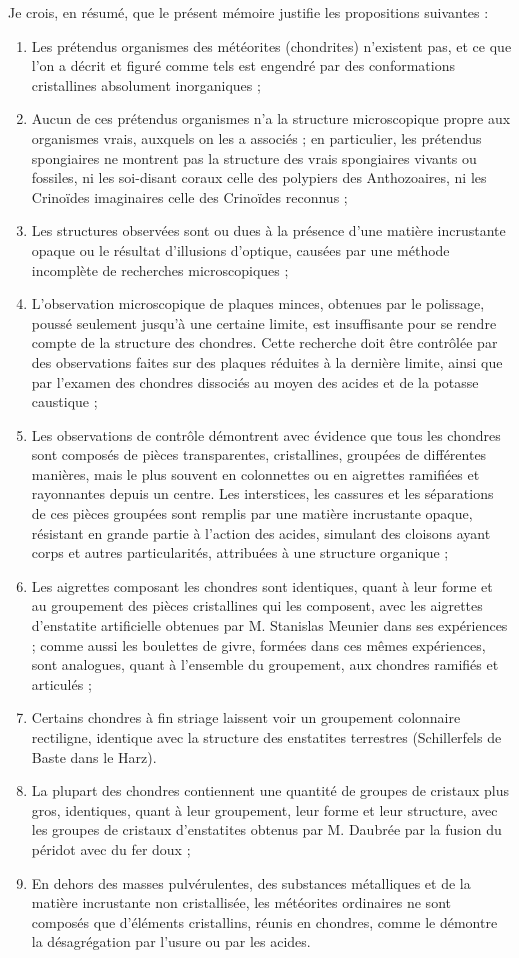 \documentclass[a4paper, 12pt, oneside, french]{book}
\begin{document}
Je crois, en résumé, que le présent mémoire justifie les propositions suivantes :
\begin{enumerate}
\item Les prétendus organismes des météorites (chondrites) n'existent pas, et ce que l'on a décrit et figuré comme tels est engendré par des conformations cristallines absolument inorganiques ;
\item Aucun de ces prétendus organismes n'a la structure microscopique propre aux organismes vrais, auxquels on les a associés ; en particulier, les prétendus spongiaires ne montrent pas la structure des vrais spongiaires vivants ou fossiles, ni les soi-disant coraux celle des polypiers des Anthozoaires, ni les Crinoïdes imaginaires celle des Crinoïdes reconnus ;
\item Les structures observées sont ou dues à la présence d'une matière incrustante opaque ou le résultat d'illusions d'optique, causées par une méthode incomplète de recherches microscopiques ;
\item L'observation microscopique de plaques minces, obtenues par le polissage, poussé seulement jusqu'à une certaine limite, est insuffisante pour se rendre compte de la structure des chondres. Cette recherche doit être contrôlée par des observations faites sur des plaques réduites à la dernière limite, ainsi que par l'examen des chondres dissociés au moyen des acides et de la potasse caustique ;
\item Les observations de contrôle démontrent avec évidence que tous les chondres sont composés de pièces transparentes, cristallines, groupées de différentes manières, mais le plus souvent en colonnettes ou en aigrettes ramifiées et rayonnantes depuis un centre. Les interstices, les cassures et les séparations de ces pièces groupées sont remplis par une matière incrustante opaque, résistant en grande partie à l'action des acides, simulant des cloisons \og ayant corps \fg et autres particularités, attribuées à une structure organique ;
\item Les aigrettes composant les chondres sont identiques, quant à leur forme et au groupement des pièces cristallines qui les composent, avec les aigrettes d'enstatite artificielle obtenues par M. Stanislas Meunier dans ses expériences ; comme aussi les boulettes de givre, formées dans ces mêmes expériences, sont analogues, quant à l'ensemble du groupement, aux chondres ramifiés et articulés ;
\item Certains chondres à fin striage laissent voir un groupement colonnaire rectiligne, identique avec la structure des enstatites terrestres (Schillerfels de Baste dans le Harz).
\item La plupart des chondres contiennent une quantité de groupes de cristaux plus gros, identiques, quant à leur groupement, leur forme et leur structure, avec les groupes de cristaux d'enstatites obtenus par M. Daubrée par la fusion du péridot avec du fer doux ;
\item En dehors des masses pulvérulentes, des substances métalliques et de la matière incrustante non cristallisée, les météorites ordinaires ne sont composés que d'éléments cristallins, réunis en chondres, comme le démontre la désagrégation par l'usure ou par les acides.
\end{enumerate}
\end{document}
